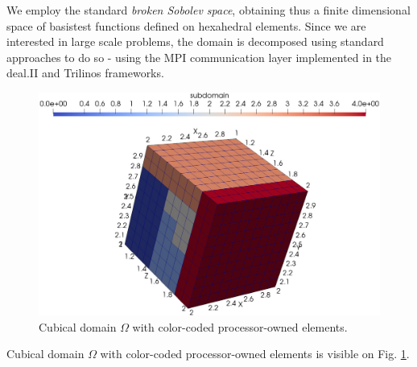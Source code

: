 \documentclass[journal,transmag]{IEEEtran}
\begin{document}
We employ the standard \textit{broken Sobolev space}, obtaining thus a finite dimensional space of basis\/test functions defined on hexahedral elements. Since we are interested in large scale problems, the domain is decomposed using standard approaches to do so - using the MPI communication layer implemented in the deal.II \cite{deal} and Trilinos \cite{trilinos} frameworks. 
\begin{figure}[ht]
	\begin{center}
		\includegraphics[width=0.85\columnwidth]{cube.jpg}
		\caption{Cubical domain $\Omega$ with color-coded processor-owned elements.}
		\label{figure:domainDecomposition}
	\end{center}
\end{figure}
Cubical domain $\Omega$ with color-coded processor-owned elements is visible on Fig. \ref{figure:domainDecomposition}.
\end{document}
